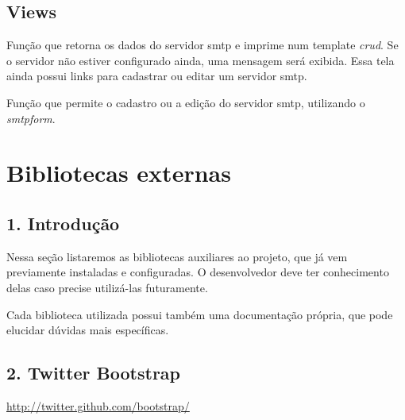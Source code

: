 \documentclass[letterpaper,10pt,brazil]{sphinxmanual}
\begin{document}
\subsection{Views}
\label{apps/smtp:module-smtp.views}\label{apps/smtp:views}

\begin{fulllineitems}
\label{apps/smtp:smtp.views.index}
Função que retorna os dados do servidor smtp e imprime num template \emph{crud}. Se o servidor não estiver configurado ainda, uma mensagem será exibida. Essa tela ainda possui links para cadastrar ou editar um servidor smtp.

\end{fulllineitems}


\begin{fulllineitems}
\label{apps/smtp:smtp.views.configure}
Função que permite o cadastro ou a edição do servidor smtp, utilizando o \emph{smtpform}.

\end{fulllineitems}



\section{Bibliotecas externas}
\label{bibliotecas:bibliotecas-externas}\label{bibliotecas::doc}

\subsection{1. Introdução}
\label{bibliotecas:introducao}
Nessa seção listaremos as bibliotecas auxiliares ao projeto, que já vem previamente instaladas e configuradas. O desenvolvedor deve ter conhecimento delas caso precise utilizá-las futuramente.

Cada biblioteca utilizada possui também uma documentação própria, que pode elucidar dúvidas mais específicas.


\subsection{2. Twitter Bootstrap}
\label{bibliotecas:twitter-bootstrap}
\href{http://twitter.github.com/bootstrap/}{http://twitter.github.com/bootstrap/}
\end{document}
